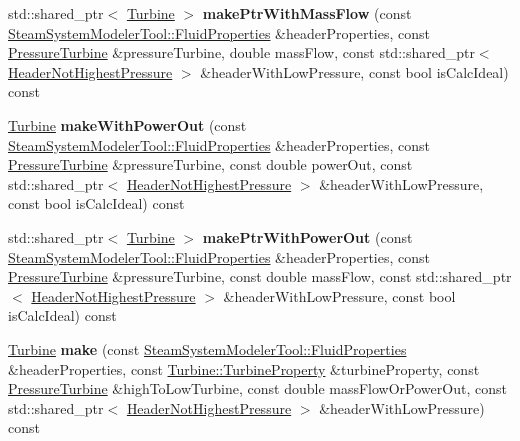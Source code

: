 \begin{DoxyCompactItemize}
std\+::shared\+\_\+ptr$<$ \hyperlink{class_turbine}{Turbine} $>$ {\bfseries make\+Ptr\+With\+Mass\+Flow} (const \hyperlink{struct_steam_system_modeler_tool_1_1_fluid_properties}{Steam\+System\+Modeler\+Tool\+::\+Fluid\+Properties} \&header\+Properties, const \hyperlink{class_pressure_turbine}{Pressure\+Turbine} \&pressure\+Turbine, double mass\+Flow, const std\+::shared\+\_\+ptr$<$ \hyperlink{class_header_not_highest_pressure}{Header\+Not\+Highest\+Pressure} $>$ \&header\+With\+Low\+Pressure, const bool is\+Calc\+Ideal) const
\item 
\mbox{\label{class_turbine_factory_af298ec9ac7d96e670c28f7552dc238bc}} 
\hyperlink{class_turbine}{Turbine} {\bfseries make\+With\+Power\+Out} (const \hyperlink{struct_steam_system_modeler_tool_1_1_fluid_properties}{Steam\+System\+Modeler\+Tool\+::\+Fluid\+Properties} \&header\+Properties, const \hyperlink{class_pressure_turbine}{Pressure\+Turbine} \&pressure\+Turbine, const double power\+Out, const std\+::shared\+\_\+ptr$<$ \hyperlink{class_header_not_highest_pressure}{Header\+Not\+Highest\+Pressure} $>$ \&header\+With\+Low\+Pressure, const bool is\+Calc\+Ideal) const
\item 
\mbox{\label{class_turbine_factory_a5e7dfafcb9dcf319b1fd58cfd4f82970}} 
std\+::shared\+\_\+ptr$<$ \hyperlink{class_turbine}{Turbine} $>$ {\bfseries make\+Ptr\+With\+Power\+Out} (const \hyperlink{struct_steam_system_modeler_tool_1_1_fluid_properties}{Steam\+System\+Modeler\+Tool\+::\+Fluid\+Properties} \&header\+Properties, const \hyperlink{class_pressure_turbine}{Pressure\+Turbine} \&pressure\+Turbine, const double mass\+Flow, const std\+::shared\+\_\+ptr$<$ \hyperlink{class_header_not_highest_pressure}{Header\+Not\+Highest\+Pressure} $>$ \&header\+With\+Low\+Pressure, const bool is\+Calc\+Ideal) const
\item 
\mbox{\label{class_turbine_factory_acf5435509834ef1d0694b1323ad7f8df}} 
\hyperlink{class_turbine}{Turbine} {\bfseries make} (const \hyperlink{struct_steam_system_modeler_tool_1_1_fluid_properties}{Steam\+System\+Modeler\+Tool\+::\+Fluid\+Properties} \&header\+Properties, const \hyperlink{class_turbine_a5db4f65cf2539e3837684d53221ade12}{Turbine\+::\+Turbine\+Property} \&turbine\+Property, const \hyperlink{class_pressure_turbine}{Pressure\+Turbine} \&high\+To\+Low\+Turbine, const double mass\+Flow\+Or\+Power\+Out, const std\+::shared\+\_\+ptr$<$ \hyperlink{class_header_not_highest_pressure}{Header\+Not\+Highest\+Pressure} $>$ \&header\+With\+Low\+Pressure) const

\end{DoxyCompactItemize}
